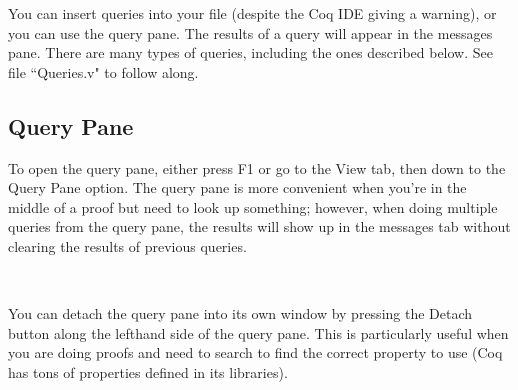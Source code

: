 
You can insert queries into your file (despite the Coq IDE giving a warning), or you can use the query pane. 
The results of a query will appear in the messages pane.
There are many types of queries, including the ones described below. 
See file ``Queries.v" to follow along.

\subsection{Query Pane} \label{query_pane}
To open the query pane, either press F1 or go to the View tab, then down to the Query Pane option. 
The query pane is more convenient when you're in the middle of a proof but need to look up something; 
however, when doing multiple queries from the query pane, the results will show up in the messages tab without clearing the results of previous queries.

~\\
\begin{minipage}{\textwidth}
\end{minipage}

\noindent
You can detach the query pane into its own window by pressing the Detach button along the lefthand side of the query pane.
This is particularly useful when you are doing proofs and need to search to find the correct property to use 
(Coq has tons of properties defined in its libraries).




